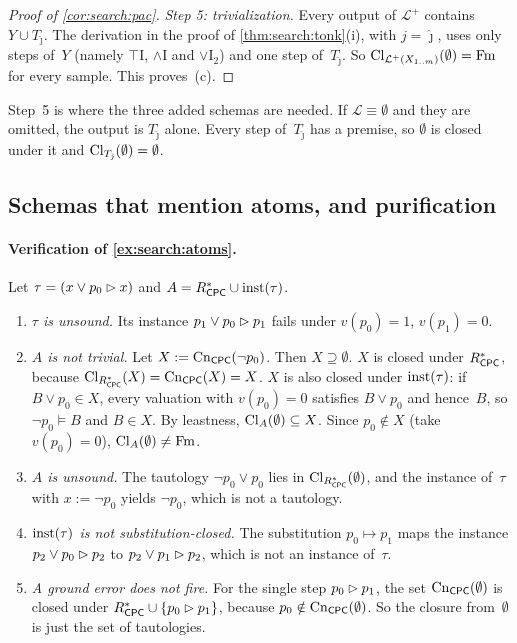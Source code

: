 \begin{proof}[Proof of \cref{cor:search:pac}]
\emph{Step 5: trivialization.} Every output of $\mathcal L^+$ contains $Y\cup T_{\hat\jmath}$. The derivation in the proof of \cref{thm:search:tonk}(i), with $j=\hat\jmath$, uses only steps of~$Y$ (namely $\top$I, $\wedge$I and $\vee$I$_2$) and one step of~$T_{\hat\jmath}$. So $\mathrm{Cl}_{\mathcal L^+(X_{1..m})}(\emptyset)=\mathrm{Fm}$ for every sample. This proves~(c).
\end{proof}

\begin{remark}\label{rem:app:search:pac}
Step~5 is where the three added schemas are needed. If $\mathcal L\equiv\emptyset$ and they are omitted, the output is $T_{\hat\jmath}$ alone. Every step of~$T_{\hat\jmath}$ has a premise, so $\emptyset$ is closed under it and $\mathrm{Cl}_{T_{\hat\jmath}}(\emptyset)=\emptyset$.
\end{remark}

\subsection{Schemas that mention atoms, and purification}\label{app:search:purify}

\paragraph{Verification of \cref{ex:search:atoms}.}
Let $\tau=(x\vee p_0\rhd x)$ and $A=R^{*}_{\mathsf{CPC}}\cup\mathrm{inst}(\tau)$.
\begin{enumerate}[label=(\alph*)]
\item \emph{$\tau$ is unsound.} Its instance $p_1\vee p_0\rhd p_1$ fails under $v(p_0)=1$, $v(p_1)=0$.
\item \emph{$A$ is not trivial.} Let $X:=\mathrm{Cn}_{\mathsf{CPC}}(\neg p_0)$. Then $X\supseteq\emptyset$. $X$ is closed under $R^{*}_{\mathsf{CPC}}$, because $\mathrm{Cl}_{R^{*}_{\mathsf{CPC}}}(X)=\mathrm{Cn}_{\mathsf{CPC}}(X)=X$. $X$ is also closed under $\mathrm{inst}(\tau)$: if $B\vee p_0\in X$, every valuation with $v(p_0)=0$ satisfies $B\vee p_0$ and hence~$B$, so $\neg p_0\models B$ and $B\in X$. By leastness, $\mathrm{Cl}_A(\emptyset)\subseteq X$. Since $p_0\notin X$ (take $v(p_0)=0$), $\mathrm{Cl}_A(\emptyset)\ne\mathrm{Fm}$.
\item \emph{$A$ is unsound.} The tautology $\neg p_0\vee p_0$ lies in $\mathrm{Cl}_{R^{*}_{\mathsf{CPC}}}(\emptyset)$, and the instance of~$\tau$ with $x:=\neg p_0$ yields $\neg p_0$, which is not a tautology.
\item \emph{$\mathrm{inst}(\tau)$ is not substitution-closed.} The substitution $p_0\mapsto p_1$ maps the instance $p_2\vee p_0\rhd p_2$ to $p_2\vee p_1\rhd p_2$, which is not an instance of~$\tau$.
\item \emph{A ground error does not fire.} For the single step $p_0\rhd p_1$, the set $\mathrm{Cn}_{\mathsf{CPC}}(\emptyset)$ is closed under $R^{*}_{\mathsf{CPC}}\cup\{p_0\rhd p_1\}$, because $p_0\notin\mathrm{Cn}_{\mathsf{CPC}}(\emptyset)$. So the closure from~$\emptyset$ is just the set of tautologies.
\end{enumerate}

